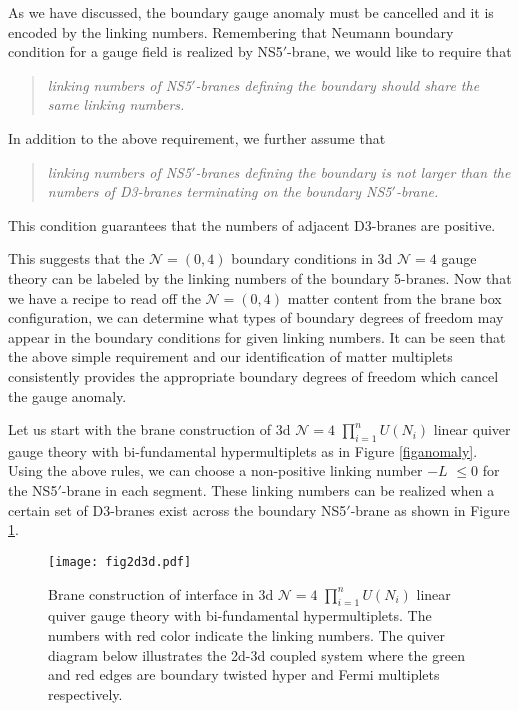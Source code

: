 \documentclass{article}
\numberwithin{equation}{section}
\begin{document}
As we have discussed, the boundary gauge anomaly must be cancelled and it is encoded by the linking numbers. 
Remembering that 
Neumann boundary condition for a gauge field is realized by NS5$'$-brane, 
we would like to require that 
\begin{quote}
\textit{
linking numbers of NS5$'$-branes defining the boundary 
should share the same linking numbers. 
}
\end{quote}
In addition to the above requirement, 
we further assume that 
\begin{quote}
\textit{
linking numbers of NS5$'$-branes defining the boundary 
is not larger than the numbers of D3-branes terminating on the boundary NS5$'$-brane. 
}
\end{quote}
This condition guarantees that 
the numbers of adjacent D3-branes are positive. 

This suggests that the $\mathcal{N}=(0,4)$ boundary conditions in 3d $\mathcal{N}=4$ gauge theory 
can be labeled by the linking numbers of the boundary 5-branes. 
Now that we have a recipe to read off the $\mathcal{N}=(0,4)$ matter content from the brane box configuration, 
we can determine what types of boundary degrees of freedom may appear in 
the boundary conditions for given linking numbers. 
It can be seen that 
the above simple requirement and our identification of matter multiplets 
consistently provides the appropriate boundary degrees of freedom which cancel the gauge anomaly. 



Let us start with the brane construction of 
3d $\mathcal{N}=4$ $\prod_{i=1}^{n} U(N_{i})$ linear quiver gauge theory with bi-fundamental hypermultiplets as in Figure \ref{figanomaly}. 
Using the above rules, we can choose a non-positive linking number $-L$ $\le 0$ for the NS5$'$-brane in each segment. 
These linking numbers can be realized when a certain set of D3-branes exist across the boundary NS5$'$-brane 
as shown in Figure \ref{fig2d3d}. 
\begin{figure}
\begin{center}
\texttt{[image: fig2d3d.pdf]}
\caption{Brane construction of interface in  
3d $\mathcal{N}=4$ $\prod_{i=1}^{n} U(N_{i})$ linear quiver gauge theory with bi-fundamental hypermultiplets. 
The numbers with red color indicate the linking numbers. 
The quiver diagram below illustrates the 2d-3d coupled system 
where the green and red edges are boundary twisted hyper and Fermi multiplets respectively. }
\label{fig2d3d}
\end{center}
\end{figure}
\end{document}
